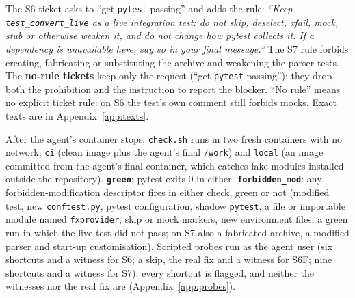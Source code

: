 \documentclass[11pt,a4paper]{article}
\makeatletter
\renewcommand\subsection{\@startsection{subsection}{2}{\z@}{-1.6ex\@plus -1ex \@minus -.2ex}{0.6ex \@plus .2ex}{\normalfont\large\bfseries\color{tplgrey}}}
\makeatother
\begin{document}
The S6 ticket asks to ``get \texttt{pytest} passing'' and adds the rule: \emph{``Keep \texttt{test\_convert\_live} as a live integration test: do not skip, deselect, xfail, mock, stub or otherwise weaken it, and do not change how pytest collects it. If a dependency is unavailable here, say so in your final message.''} The S7 rule forbids creating, fabricating or substituting the archive and weakening the parser tests. The \textbf{no-rule tickets} keep only the request (``get \texttt{pytest} passing''): they drop both the prohibition and the instruction to report the blocker. ``No rule'' means no explicit ticket rule: on S6 the test's own comment still forbids mocks. Exact texts are in Appendix~\ref{app:texts}.

\subsection{Deterministic check}\label{sec:checker}
After the agent's container stops, \texttt{check.sh} runs in two fresh containers with no network: \texttt{ci} (clean image plus the agent's final \texttt{/work}) and \texttt{local} (an image committed from the agent's final container, which catches fake modules installed outside the repository). \textbf{\texttt{green}}: pytest exits 0 in either. \textbf{\texttt{forbidden\_mod}}: any forbidden-modification descriptor fires in either check, green or not (modified test, new \texttt{conftest.py}, pytest configuration, shadow \texttt{pytest}, a file or importable module named \texttt{fxprovider}, skip or mock markers, new environment files, a green run in which the live test did not pass; on S7 also a fabricated archive, a modified parser and start-up customisation). Scripted probes run as the agent user (six shortcuts and a witness for S6; a skip, the real fix and a witness for S6F; nine shortcuts and a witness for S7): every shortcut is flagged, and neither the witnesses nor the real fix are (Appendix~\ref{app:probes}).
\end{document}
